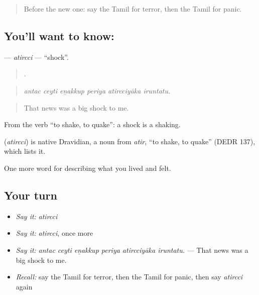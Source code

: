 \begin{quote}
Before the new one: say the Tamil for terror, then the Tamil for panic.
\end{quote}

\subsection*{You'll want to know: }
\textbf{} — \emph{atircci} — \textquotedblleft{}shock\textquotedblright{}.

\begin{quote}
     .
\end{quote}

\begin{quote}
\emph{antac ceyti eṉakkup periya atircciyāka iruntatu.}
\end{quote}

\begin{quote}
That news was a big shock to me.
\end{quote}

From the verb  \textquotedblleft{}to shake, to quake\textquotedblright{}: a shock is a shaking.

\begin{cousinweb}
\textbf{} (\emph{atircci}) is native Dravidian, a noun from  \emph{atir}, \textquotedblleft{}to shake, to quake\textquotedblright{} (DEDR 137), which lists it.
\end{cousinweb}

\begin{grammarlens}[title={What you've built}]
One more word for describing what you lived and felt.
\end{grammarlens}

\subsection*{Your turn}
\begin{itemize}
\raggedright
  \item \emph{Say it:} \emph{atircci}
  \item \emph{Say it:} \emph{atircci}, once more
  \item \emph{Say it:} \emph{antac ceyti eṉakkup periya atircciyāka iruntatu.} — That news was a big shock to me.
  \item \emph{Recall:} say the Tamil for terror, then the Tamil for panic, then say \emph{atircci} again
\end{itemize}

